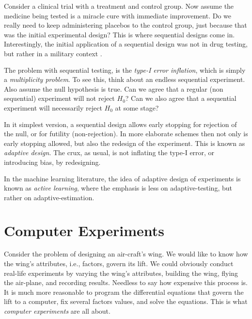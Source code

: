 Consider a clinical trial with a treatment and control group.
Now assume the medicine being tested is a miracle cure with immediate improvement. 
Do we really need to keep administering placebos to the control group, just because that was the initial experimental design?
This is where sequential designs come in.
Interestingly, the initial application of a sequential design was not in drug testing, but rather in a military context \citep{wald_sequential_1945}.

The problem with sequential testing, is the \emph{type-I error inflation}, which is simply a \emph{multiplicity problem}. 
To see this, think about an endless sequential experiment. Also assume the null hypothesis is true. 
Can we agree that a regular (non sequential) experiment will not reject $H_0$? 
Can we also agree that a sequential experiment will necessarily reject $H_0$ at some stage?

In it simplest version, a sequential design allows early stopping for rejection of the null, or for futility (non-rejection). 
In more elaborate schemes then not only is early stopping allowed, but also the redesign of the experiment. 
This is known as \emph{adaptive design}. The crux, as usual, is not inflating the type-I error, or introducing bias, by redesigning.


\begin{extra}
In the machine learning literature, the idea of adaptive design of experiments is known as \emph{active learning}, where the emphasis is less on adaptive-testing, but rather on adaptive-estimation.
\end{extra}




\section{Computer Experiments}
\begin{example}
\label{eg:wings}
Consider the problem of designing an air-craft's wing.
We would like to know how the wing's attributes, i.e., factors, govern its lift.
We could obviously conduct real-life experiments by varying the wing's attributes, building the wing, flying the air-plane, and recording results. 
Needless to say how expensive this process is.
It is much more reasonable to program the differential equations that govern the lift to a computer, fix several factors values, and solve the equations.
This is what \emph{computer experiments} are all about. 
\end{example}


